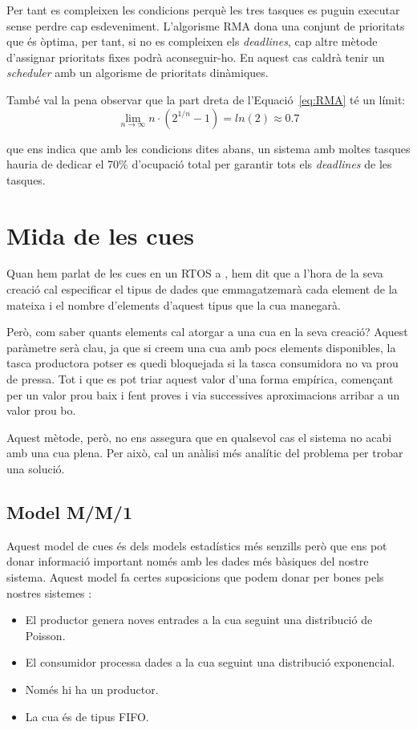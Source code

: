 Per tant es compleixen les condicions perquè les tres tasques es puguin executar sense perdre cap esdeveniment. L'algorisme RMA dona una conjunt de prioritats que és òptima, per tant, si no es compleixen els {\em deadlines}, cap altre mètode d'assignar prioritats fixes podrà aconseguir-ho. En aquest cas caldrà tenir un {\em scheduler} amb un algorisme de prioritats dinàmiques.

També val la pena observar que la part dreta de l'Equació~\ref{eq:RMA} té un límit:
\begin{equation*}
 \lim_{n\to\infty} n \cdot (2^{1/n}-1) = ln(2) \approx 0.7
\end{equation*}

que ens indica que amb les condicions dites abans, un sistema amb moltes tasques hauria de dedicar el 70\% d'ocupació total per garantir tots els {\em deadlines} de les tasques.

\section{Mida de les cues}
\label{sec:mida_cues}
Quan hem parlat de les cues en un \gls{RTOS} a , hem dit que a l'hora de la seva creació cal especificar el tipus de dades que emmagatzemarà cada element de la mateixa i el nombre d'elements d'aquest tipus que la cua manegarà.

Però, com saber quants elements cal atorgar a una cua en la seva creació? Aquest paràmetre serà clau, ja que si creem una cua amb pocs elements disponibles, la tasca productora potser es quedi bloquejada si la tasca consumidora no va prou de pressa. Tot i que es pot triar aquest valor d'una forma empírica, començant per un valor prou baix i fent proves i via successives aproximacions arribar a un valor prou bo.

Aquest mètode, però, no ens assegura que en qualsevol cas el sistema no acabi amb una cua plena. Per això, cal un anàlisi més analític del problema per trobar una solució.

\subsection{Model M/M/1}
\label{sub:mm1}

Aquest model de cues és dels models estadístics més senzills però que ens pot donar informació important només amb les dades més bàsiques del nostre sistema. Aquest model fa certes suposicions que podem donar per bones pels nostres sistemes \cite{mm1_1}\cite{mm1_2}\cite{mm1_3}\cite{mm1_4}:
\begin{itemize}
 \item El productor genera noves entrades a la cua seguint una distribució de Poisson.
 \item El consumidor processa dades a la cua seguint una distribució exponencial.
 \item Només hi ha un productor.
 \item La cua és de tipus FIFO.
\end{itemize}

